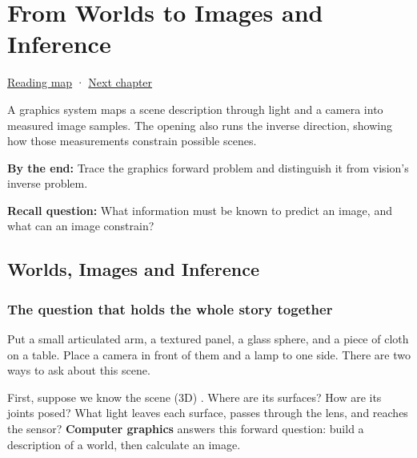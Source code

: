 \chapter{From Worlds to Images and Inference}\label{03-visual-computing-i-ch001-from-worlds-to-images-and-inference}\hypertarget{03-visual-computing-i-ch001}{}\label{stagechapter:03-visual-computing-i-ch001}

\hypertarget{03-visual-computing-i-ch001-from-worlds-to-images-and-inference}{}

\hyperref[volume-reading-map]{Reading map} · \hyperref[03-visual-computing-i-ch002-surfaces-topology-and-parameterization]{Next chapter}

A graphics system maps a scene description through light and a camera into measured image samples. The opening also runs the inverse direction, showing how those measurements constrain possible scenes.

\textbf{By the end:} Trace the graphics forward problem and distinguish it from vision's inverse problem.

\textbf{Recall question:} What information must be known to predict an image, and what can an image constrain?

\section{Worlds, Images and Inference}\label{03-visual-computing-i-ch001-worlds-images-and-inference}

\hypertarget{03-visual-computing-i-ch001-worlds-images-and-inference}{}

\subsection{The question that holds the whole story together}\label{03-visual-computing-i-ch001-the-question-that-holds-the-whole-story-together}

\hypertarget{03-visual-computing-i-ch001-the-question-that-holds-the-whole-story-together}{}

Put a small articulated arm, a textured panel, a glass sphere, and a piece of cloth on a table. Place a camera in front of them and a lamp to one side. There are two ways to ask about this scene.

First, suppose we know the scene (3D) . Where are its surfaces? How are its joints posed? What light leaves each surface, passes through the lens, and reaches the sensor? \textbf{Computer graphics} answers this forward question: build a description of a world, then calculate an image.

